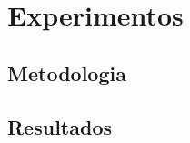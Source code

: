 \section{Experimentos}
\label{sec:experimentos}


\subsection{Metodologia}
\label{sec:experimentos:metodologia}


\subsection{Resultados}
\label{sec:experimentos:resultados}

